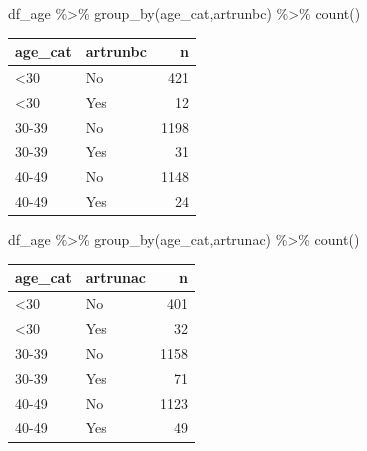 \documentclass[
  letterpaper,
  DIV=11,
  numbers=noendperiod]{scrartcl}
\newenvironment{Shaded}{\begin{snugshade}}{\end{snugshade}}
\newcommand{\FunctionTok}[1]{\textcolor[rgb]{0.28,0.35,0.67}{#1}}
\newcommand{\NormalTok}[1]{\textcolor[rgb]{0.00,0.23,0.31}{#1}}
\newcommand{\SpecialCharTok}[1]{\textcolor[rgb]{0.37,0.37,0.37}{#1}}
\begin{document}
\begin{Shaded}
\begin{Highlighting}[]
\NormalTok{df\_age }\SpecialCharTok{\%\textgreater{}\%} \FunctionTok{group\_by}\NormalTok{(age\_cat,artrunbc) }\SpecialCharTok{\%\textgreater{}\%} 
  \FunctionTok{count}\NormalTok{()}
\end{Highlighting}
\end{Shaded}

\begin{longtable}[]{@{}llr@{}}
\toprule\noalign{}
age\_cat & artrunbc & n \\
\midrule\noalign{}
\endhead
\bottomrule\noalign{}
\endlastfoot
\textless30 & No & 421 \\
\textless30 & Yes & 12 \\
30-39 & No & 1198 \\
30-39 & Yes & 31 \\
40-49 & No & 1148 \\
40-49 & Yes & 24 \\
\end{longtable}

\begin{Shaded}
\begin{Highlighting}[]
\NormalTok{df\_age }\SpecialCharTok{\%\textgreater{}\%} \FunctionTok{group\_by}\NormalTok{(age\_cat,artrunac) }\SpecialCharTok{\%\textgreater{}\%} 
  \FunctionTok{count}\NormalTok{()}
\end{Highlighting}
\end{Shaded}

\begin{longtable}[]{@{}llr@{}}
\toprule\noalign{}
age\_cat & artrunac & n \\
\midrule\noalign{}
\endhead
\bottomrule\noalign{}
\endlastfoot
\textless30 & No & 401 \\
\textless30 & Yes & 32 \\
30-39 & No & 1158 \\
30-39 & Yes & 71 \\
40-49 & No & 1123 \\
40-49 & Yes & 49 \\
\end{longtable}
\end{document}
